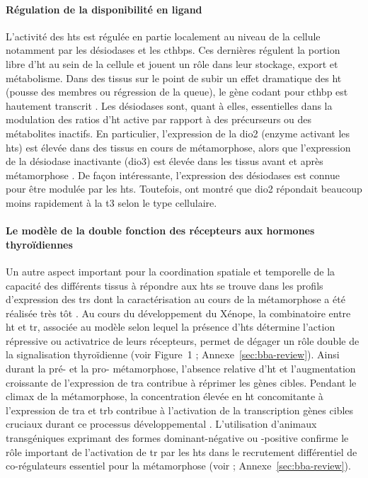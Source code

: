\documentclass[../main.tex]{subfiles}
\begin{document}
\paragraph{Régulation de la disponibilité en ligand}
L'activité des \glspl{ht} est régulée en partie localement au niveau de la cellule notamment par les désiodases et les \glspl{cthbp}.
Ces dernières régulent la portion libre d'\gls{ht} au sein de la cellule et jouent un rôle dans leur stockage, export et métabolisme.
Dans des tissus sur le point de subir un effet dramatique des \gls{ht} (pousse des membres ou régression de la queue), le gène codant pour \gls{cthbp} est hautement transcrit \citep{Shi1994}.
Les désiodases sont, quant à elles, essentielles dans la modulation des ratios d'\gls{ht} active par rapport à des précurseurs ou des métabolites inactifs.
En particulier, l'expression de la \gls{dio2} (enzyme activant les \glspl{ht}) est élevée dans des tissus en cours de métamorphose, alors que l'expression de la désiodase inactivante (\gls{dio3}) est élevée dans les tissus avant et après métamorphose \citep{Leloup1981,Galton1989}.
De façon intéressante, l'expression des désiodases est connue pour être modulée par les \glspl{ht}. Toutefois, \citet{Bonett2010} ont montré que \gls{dio2} répondait beaucoup moins rapidement à la \gls{t3} selon le type cellulaire.

\paragraph{Le modèle de la double fonction des récepteurs aux hormones thyroïdiennes}
Un autre aspect important pour la coordination spatiale et temporelle de la capacité des différents tissus à répondre aux \glspl{ht} se trouve dans les profils d'expression des \glspl{tr} dont la caractérisation au cours de la métamorphose a été réalisée très tôt \citep{Yaoita1990}.
Au cours du développement du Xénope, la combinatoire entre \gls{ht} et \gls{tr}, associée au modèle selon lequel la présence d'\glspl{ht} détermine l'action répressive ou activatrice de leurs récepteurs, permet de dégager un rôle double de la signalisation thyroïdienne (voir Figure~1 \citealp{Grimaldi2012}; Annexe~\ref{sec:bba-review}).
Ainsi durant la pré- et la pro- métamorphose, l'absence relative d'\gls{ht} et l'augmentation croissante de l'expression de \gls{tra} contribue à réprimer les gènes cibles.
Pendant le climax de la métamorphose, la concentration élevée en \gls{ht} concomitante à l'expression de \gls{tra} et \gls{trb} contribue à l'activation de la transcription gènes cibles cruciaux durant ce processus développemental \citep{Sachs2000}.
L'utilisation d'animaux transgéniques exprimant des formes dominant-négative \citep{Schreiber2001,Buchholz2003} ou -positive \citep{Buchholz2004} confirme le rôle important de l'activation de \gls{tr} par les \glspl{ht} dans le recrutement différentiel de co-régulateurs essentiel pour la métamorphose (voir \citealp{Grimaldi2012}; Annexe~\ref{sec:bba-review}).
\end{document}
